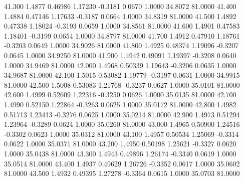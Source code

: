   41.300   1.4877   0.46986   1.17230  -0.3181   0.0670   1.0000  34.8072  81.0000
  41.400   1.4884   0.47146   1.17633  -0.3187   0.0664   1.0000  34.8319  81.0000
  41.500   1.4892   0.47338   1.18024  -0.3193   0.0659   1.0000  34.8561  81.0000
  41.600   1.4901   0.47583   1.18401  -0.3199   0.0654   1.0000  34.8797  81.0000
  41.700   1.4912   0.47910   1.18761  -0.3203   0.0649   1.0000  34.9026  81.0000
  41.800   1.4925   0.48374   1.19096  -0.3207   0.0645   1.0000  34.9250  81.0000
  41.900   1.4942   0.49091   1.19397  -0.3208   0.0640   1.0000  34.9469  81.0000
  42.000   1.4968   0.50339   1.19643  -0.3206   0.0635   1.0000  34.9687  81.0000
  42.100   1.5015   0.53082   1.19779  -0.3197   0.0631   1.0000  34.9915  81.0000
  42.500   1.5008   0.53083   1.21768  -0.3237   0.0627   1.0000  35.0101  81.0000
  42.600   1.4999   0.52609   1.22316  -0.3250   0.0626   1.0000  35.0135  81.0000
  42.700   1.4990   0.52150   1.22864  -0.3263   0.0625   1.0000  35.0172  81.0000
  42.800   1.4982   0.51713   1.23413  -0.3276   0.0625   1.0000  35.0214  81.0000
  42.900   1.4973   0.51294   1.23964  -0.3289   0.0624   1.0000  35.0260  81.0000
  43.000   1.4965   0.50900   1.24516  -0.3302   0.0623   1.0000  35.0312  81.0000
  43.100   1.4957   0.50534   1.25069  -0.3314   0.0622   1.0000  35.0371  81.0000
  43.200   1.4950   0.50198   1.25621  -0.3327   0.0620   1.0000  35.0438  81.0000
  43.300   1.4943   0.49896   1.26174  -0.3340   0.0619   1.0000  35.0514  81.0000
  43.400   1.4937   0.49629   1.26726  -0.3352   0.0617   1.0000  35.0602  81.0000
  43.500   1.4932   0.49395   1.27278  -0.3364   0.0615   1.0000  35.0703  81.0000
